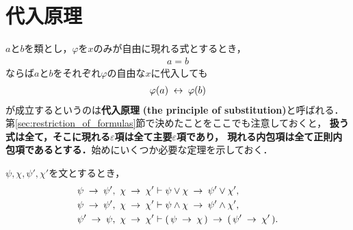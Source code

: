 \section{代入原理}
	$a$と$b$を類とし，$\varphi$を$x$のみが自由に現れる式とするとき，
	\begin{align}
		a = b
	\end{align}
	ならば$a$と$b$をそれぞれ$\varphi$の自由な$x$に代入しても
	\begin{align}
		\varphi(a) \hspace{0.25em}\leftrightarrow\hspace{0.25em} \varphi(b)
	\end{align}
	が成立するというのは{\bf 代入原理}
	{\bf (the principle of substitution)}と呼ばれる．
	第\ref{sec:restriction_of_formulas}節で決めたことをここでも注意しておくと，
	{\bf 扱う式は全て，そこに現れる$\varepsilon$項は全て主要$\varepsilon$項であり，
	現れる内包項は全て正則内包項であるとする．}始めにいくつか必要な定理を示しておく．
	
	\begin{screen}
		\begin{logicalthm}
		\label{logicalthm:lemma_for_principle_of_substitution}
			$\psi,\chi,\psi',\chi'$を文とするとき，
			\begin{align}
				\psi \hspace{0.25em}\rightarrow\hspace{0.25em} \psi',\ \chi \hspace{0.25em}\rightarrow\hspace{0.25em} \chi' &\vdash
				\psi \vee \chi \hspace{0.25em}\rightarrow\hspace{0.25em} \psi' \vee \chi', 
				\label{fom:lemma_for_principle_of_substitution_1} \\
				\psi \hspace{0.25em}\rightarrow\hspace{0.25em} \psi',\ \chi \hspace{0.25em}\rightarrow\hspace{0.25em} \chi' &\vdash
				\psi \wedge \chi \hspace{0.25em}\rightarrow\hspace{0.25em} \psi' \wedge \chi', 
				\label{fom:lemma_for_principle_of_substitution_2} \\
				\psi' \hspace{0.25em}\rightarrow\hspace{0.25em} \psi,\ \chi \hspace{0.25em}\rightarrow\hspace{0.25em} \chi' &\vdash
				(\, \psi \hspace{0.25em}\rightarrow\hspace{0.25em} \chi\, ) \hspace{0.25em}\rightarrow\hspace{0.25em} (\, \psi' \hspace{0.25em}\rightarrow\hspace{0.25em} \chi'\, )
				\label{fom:lemma_for_principle_of_substitution_3}.
			\end{align}
		\end{logicalthm}
	\end{screen}
	
